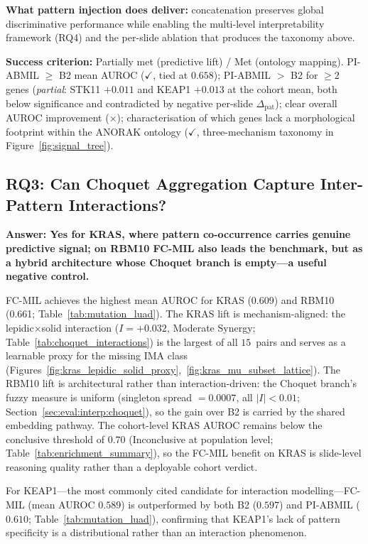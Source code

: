 \textbf{What pattern injection does deliver:} concatenation
preserves global discriminative performance while enabling the
multi-level interpretability framework (RQ4) and the per-slide
ablation that produces the taxonomy above.

\textbf{Success criterion:} Partially met (predictive lift) /
Met (ontology mapping).
PI-ABMIL $\geq$ B2 mean AUROC ($\checkmark$, tied at $0.658$);
PI-ABMIL $>$ B2 for $\geq$2 genes
(\textsl{partial}: STK11 $+0.011$ and KEAP1 $+0.013$ at the cohort
mean, both below significance and contradicted by negative per-slide
$\Delta_{\mathrm{pat}}$);
clear overall AUROC improvement ($\times$);
characterisation of which genes lack a morphological footprint
within the ANORAK ontology ($\checkmark$, three-mechanism taxonomy
in Figure~\ref{fig:signal_tree}).

\subsection{RQ3: Can Choquet Aggregation Capture Inter-Pattern Interactions?}
\label{sec:eval:rq3}

\textbf{Answer: Yes for KRAS, where pattern co-occurrence carries
genuine predictive signal; on RBM10 FC-MIL also leads the benchmark,
but as a hybrid architecture whose Choquet branch is empty---a useful
negative control.}

FC-MIL achieves the highest mean AUROC for KRAS (0.609) and RBM10
(0.661; Table~\ref{tab:mutation_luad}).
The KRAS lift is mechanism-aligned: the lepidic$\times$solid
interaction ($I = +0.032$, Moderate Synergy;
Table~\ref{tab:choquet_interactions}) is the largest of all
$15$~pairs and serves as a learnable proxy for the missing IMA
class (Figures~\ref{fig:kras_lepidic_solid_proxy},~\ref{fig:kras_mu_subset_lattice}).
The RBM10 lift is architectural rather than interaction-driven: the
Choquet branch's fuzzy measure is uniform (singleton spread $=0.0007$,
all $|I|<0.01$; Section~\ref{sec:eval:interp:choquet}), so the gain
over B2 is carried by the shared embedding pathway.
The cohort-level KRAS AUROC remains below the conclusive threshold
of $0.70$ (Inconclusive at population level;
Table~\ref{tab:enrichment_summary}), so the FC-MIL benefit on KRAS
is slide-level reasoning quality rather than a deployable cohort
verdict.

For KEAP1---the most commonly cited candidate for interaction
modelling---FC-MIL (mean AUROC $0.589$) is outperformed by both B2
($0.597$) and PI-ABMIL ($0.610$; Table~\ref{tab:mutation_luad}),
confirming that KEAP1's lack of pattern specificity is a
distributional rather than an interaction phenomenon.

